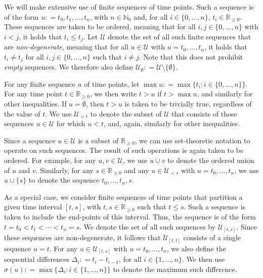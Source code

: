 \documentclass[10pt,a4paper]{paper}
\theoremstyle{definition}
\newcommand{\nats}{\mathbb{N}}
\newcommand{\natswith}{\nats_{0}}
\newcommand{\reals}{\mathbb{R}}
\newcommand{\realsnonneg}{\reals_{\geq 0}}
\newcommand{\coloneqq}{:\!=}
\begin{document}
We will make extensive use of finite sequences of time points. Such a sequence is of the form $u\coloneqq t_0,t_1,\ldots,t_n$, with $n\in\natswith$ and, for all $i\in\{0,\ldots,n\}$, $t_i\in\realsnonneg$. These sequences are taken to be ordered, meaning that for all $i,j\in\{0,\ldots,n\}$ with $i<j$, it holds that $t_i\leq t_j$. Let $\mathcal{U}$ denote the set of all such finite sequences that are \emph{non-degenerate}, meaning that for all $u\in\mathcal{U}$ with $u=t_0,\ldots,t_n$, it holds that $t_i\neq t_j$ for all $i,j\in\{0,\ldots,n\}$ such that $i\neq j$. Note that this does not prohibit \emph{empty} sequences. We therefore also define $\mathcal{U}_\emptyset\coloneqq \mathcal{U}\setminus\{\emptyset\}$. \label{notation:sequenceset}

For any finite sequence $u$ of time points, let $\max u\coloneqq \max\{t_i:i\in\{0,\ldots,n\}\}$. For any time point $t\in\realsnonneg$, we then write $t>u$ if $t>\max u$, and similarly for other inequalities. If $u=\emptyset$, then $t>u$ is taken to be trivially true, regardless of the value of $t$. We use $\mathcal{U}_{<t}$ to denote the subset of $\mathcal{U}$ that consists of those sequences $u\in\mathcal{U}$ for which $u<t$, and, again, similarly for other inequalities. \label{notation:sequenceset_ineq}

Since a sequence $u\in\mathcal{U}$ is a subset of $\realsnonneg$, we can use set-theoretic notation to operate on such sequences. The result of such operations is again taken to be ordered. For example, for any $u,v\in\mathcal{U}$, we use $u\cup v$ to denote the ordered union of $u$ and $v$. Similarly, for any $s\in\realsnonneg$ and any $u\in\mathcal{U}_{<s}$ with $u=t_0,\ldots,t_n$, we use $u\cup\{s\}$ to denote the sequence $t_0,\ldots,t_n,s$.

As a special case, we consider finite sequences of time points that partition a given time interval $[t,s]$, with $t,s\in\realsnonneg$ such that $t\leq s$. Such a sequence is taken to include the end-points of this interval.  Thus, the sequence is of the form $t=t_0< t_1<\cdots< t_n=s$. We denote the set of all such sequences by $\mathcal{U}_{[t,s]}$. Since these sequences are non-degenerate, it follows that $\mathcal{U}_{[t,t]}$ consists of a single sequence $u=t$. For any $u\in\mathcal{U}_{[t,s]}$ with $u=t_0,\ldots,t_n$, we also define the sequential differences $\Delta_i\coloneqq t_i-t_{i-1}$, for all $i\in\{1,\ldots,n\}$. We then use $\sigma(u)\coloneqq \max\{\Delta_i:i\in\{1,\ldots,n\}\}$ to denote the maximum such difference. \label{notation:sequenceset_partition}
\end{document}
